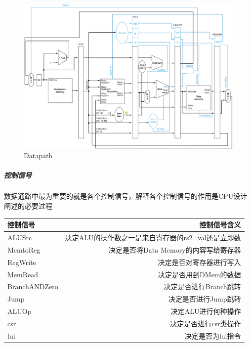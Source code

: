 \begin{figure}[H] %
    \centering %
    \includegraphics[width=1.0\textwidth]{slide5.jpg} %
    \caption{Datapath} %
    \label{Fig.6} %
\end{figure}

\subparagraph{控制信号}
数据通路中最为重要的就是各个控制信号，解释各个控制信号的作用是CPU设计阐述的必要过程 \\

\begin{tabular}{|l|r|}
    \hline
    控制信号 & 控制信号含义 \\
    \hline
    ALUSrc & 决定ALU的操作数之一是来自寄存器的rs2\_val还是立即数 \\
    \hline
    MemtoReg & 决定是否将Data Memory的内容写给寄存器 \\
    \hline
    RegWrite & 决定是否对寄存器进行写入 \\
    \hline
    MemRead & 决定是否用到DMem的数据 \\
    \hline
    BranchANDZero & 决定是否进行Branch跳转 \\
    \hline
    Jump & 决定是否进行Jump跳转 \\
    \hline
    ALUOp & 决定ALU进行何种操作 \\
    \hline
    csr & 决定是否进行csr类操作 \\
    \hline
    lui & 决定是否为lui指令 \\
    \hline
\end{tabular} \\


